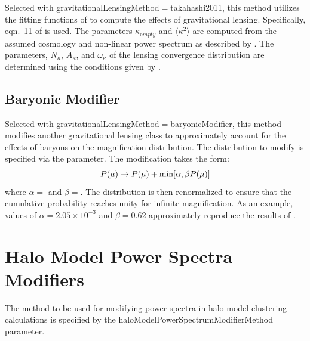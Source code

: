 Selected with {\normalfont \ttfamily gravitationalLensingMethod}$=${\normalfont \ttfamily takahashi2011}, this method utilizes the fitting functions of \cite{takahashi_probability_2011} to compute the effects of gravitational lensing. Specifically, eqn.~11 of \cite{takahashi_probability_2011} is used. The parameters $\kappa_{\mathrm empty}$ and $\langle \kappa^2 \rangle$ are computed from the assumed cosmology and non-linear power spectrum as described by \cite[][eqns.~5 and 2 respectively]{takahashi_probability_2011}. The parameters, $N_\kappa$, $A_\kappa$, and $\omega_\kappa$ of the lensing convergence distribution are determined using the conditions given by \cite[][eqn.~9]{takahashi_probability_2011}.

\subsection{Baryonic Modifier}\label{phys:gravitationalLensing:gravitationalLensingBaryonicModifer}

Selected with {\normalfont \ttfamily gravitationalLensingMethod}$=${\normalfont \ttfamily baryonicModifier}, this method modifies another gravitational lensing class to approximately account for the effects of baryons on the magnification distribution. The distribution to modify is specified via the {\normalfont \ttfamily [gravitationalLensingBaryonicModifierOriginalDistribution]} parameter. The modification takes the form:
\begin{equation}
P(\mu) \rightarrow P(\mu) + \hbox{min}[\alpha,\beta P(\mu)]
\end{equation}
where $\alpha=${\normalfont \ttfamily [gravitationalLensingBaryonicModifierAlpha]} and $\beta=${\normalfont \ttfamily [gravitationalLensingBaryonicModifierBeta]}. The distribution is then renormalized to ensure that the cumulative probability reaches unity for infinite magnification. As an example, values of $\alpha=2.05\times 10^{-3}$ and $\beta=0.62$ approximately reproduce the results of \cite[][their Fig.~1]{hilbert_strong-lensing_2008}.

\section{Halo Model Power Spectra Modifiers}

The method to be used for modifying power spectra in halo model clustering calculations is specified by the {\normalfont \ttfamily haloModelPowerSpectrumModifierMethod} parameter.

